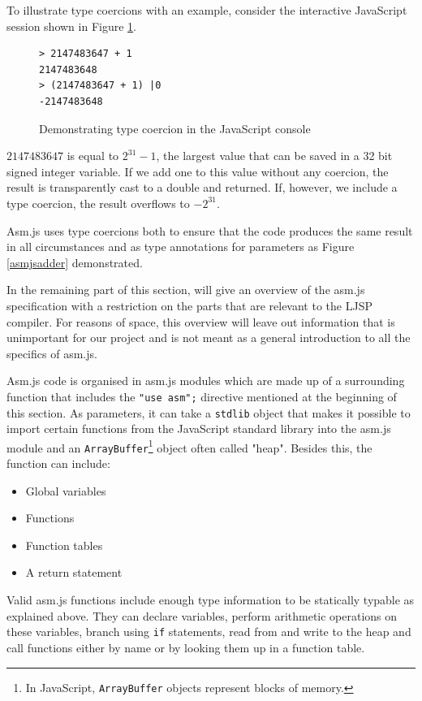 \documentclass[11pt]{report}
\begin{document}
To illustrate type coercions with an example, consider the interactive JavaScript session shown in Figure \ref{jstypecoercion}.

\begin{figure}[ht]
\begin{lstlisting}
> 2147483647 + 1
2147483648
> (2147483647 + 1) |0
-2147483648
\end{lstlisting}
\caption{Demonstrating type coercion in the JavaScript console}
\label{jstypecoercion}
\end{figure}

$2147483647$ is equal to $2^{31}-1$, the largest value that can be saved in a 32 bit signed integer variable. If we add one to this value without any coercion, the result is transparently cast to a double and returned. If, however, we include a type coercion, the result overflows to $-2^{31}$.

Asm.js uses type coercions both to ensure that the code produces the same result in all circumstances and as type annotations for parameters as Figure \ref{asmjsadder} demonstrated.

In the remaining part of this section, will give an overview of the asm.js specification with a restriction on the parts that are relevant to the LJSP compiler. For reasons of space, this overview will leave out information that is unimportant for our project and is not meant as a general introduction to all the specifics of asm.js.

Asm.js code is organised in asm.js modules which are made up of a surrounding function that includes the \texttt{"use asm";} directive mentioned at the beginning of this section. As parameters, it can take a \texttt{stdlib} object that makes it possible to import certain functions from the JavaScript standard library into the asm.js module and an \texttt{ArrayBuffer}\footnote{In JavaScript, \texttt{ArrayBuffer} objects represent blocks of memory.} object often called "heap". Besides this, the function can include:
\begin{itemize}
\item Global variables
\item Functions
\item Function tables
\item A return statement
\end{itemize}

Valid asm.js functions include enough type information to be statically typable as explained above. They can declare variables, perform arithmetic operations on these variables, branch using \texttt{if} statements, read from and write to the heap and call functions either by name or by looking them up in a function table.
\end{document}
